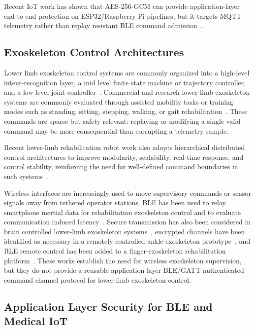 \documentclass[journal]{IEEEtran}
\begin{document}
Recent IoT work has shown that AES-256-GCM can provide application-layer end-to-end protection on ESP32/Raspberry Pi pipelines, but it targets MQTT telemetry rather than replay resistant BLE command admission~\cite{amirkhanova2026iiot}.


\subsection{Exoskeleton Control Architectures}

Lower limb exoskeleton control systems are commonly organized into a high-level intent-recognition layer, a mid level finite state machine or trajectory controller, and a low-level joint controller~\cite{tucker2015review,baud2021review}.
Commercial and research lower-limb exoskeleton systems are commonly evaluated through assisted mobility tasks or training modes such as standing, sitting, stepping, walking, or gait rehabilitation~\cite{vandijsseldonk2021predictors,lee2021locomat,atlas2030_2022}.
These commands are sparse but safety relevant: replaying or modifying a single valid command may be more consequential than corrupting a telemetry sample.

Recent lower-limb rehabilitation robot work also adopts hierarchical distributed control architectures to improve modularity, scalability, real-time response, and control stability, reinforcing the need for well-defined command boundaries in such systems~\cite{wang2025distributed}.

Wireless interfaces are increasingly used to move supervisory commands or sensor signals away from tethered operator stations.
BLE has been used to relay smartphone inertial data for rehabilitation exoskeleton control and to evaluate communication induced latency~\cite{andersson2024wireless}.
Secure transmission has also been considered in brain controlled lower-limb exoskeleton systems~\cite{vinoj2019bclle}, encrypted channels have been identified as necessary in a remotely controlled ankle-exoskeleton prototype~\cite{ozhiken2025ankle}, and BLE remote control has been added to a finger-exoskeleton rehabilitation platform~\cite{wilhelm2022finger}.
These works establish the need for wireless exoskeleton supervision, but they do not provide a reusable application-layer BLE/GATT authenticated command channel protocol for lower-limb exoskeleton control.

\subsection{Application Layer Security for BLE and Medical IoT}
\end{document}
